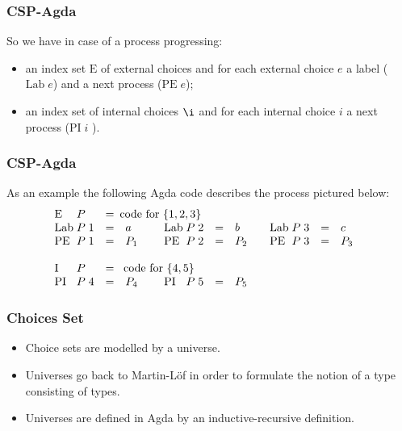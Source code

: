 \documentclass{beamer}
\newcommand{\pii}{\mathrm{PI}}
\newcommand{\pe}{\mathrm{PE}}
\newcommand{\ii}{\mathrm{I}}
\newcommand{\e}{\mathrm{E}}
\newcommand{\lab}{\mathrm{Lab}}
\newcommand{\includeXfigPictexWithoutFigure}[1]{\ifpdf
\begin{center}

\end{center}\else%
\begin{center}

\end{center}\fi}
\begin{document}
\begin{frame}
\frametitle{CSP-Agda}
So we have in case of a process progressing: 
\begin{itemize}

\item an index set $\e$ of external choices and for each external choice $e$ a label ($\lab\;e$) and a next process ($\pe\;e$);

\item an index set of internal choices $\i$ and for each internal choice $i$ a next process ($\pii\;i$ ).
\end{itemize}
\end{frame}







\begin{frame}
\frametitle{CSP-Agda}

As an example the following Agda code describes the process pictured below:
\[\begin{array}{@{}l@{}lclcl@{}lclcl@{}lcllclclclclclclclclcl}
\e \; &P &=& \multicolumn{25}{@{}l}{\mbox{code for }\{1,2,3\} 
\mbox{\qquad \qquad \qquad \qquad \qquad \qquad \qquad }}\\
\lab \; &P \;1 &=& a &\ & \lab \;&P\;2 &=& b & & \lab\; &P\;3 &=& c\\
\pe \; &P\;1 &=& P_1&  &\pe \; &P\;2 &=& P_2 & & \pe\; &P \;3 &=& P_3&
\\
\ \\
\ii\;&P&=& \multicolumn{25}{@{}l}{\mbox{ code for } \{4,5\}}\\
\pii \;&P\;4 &=& P_4&  &\pii \;&P\;5 &=& P_5
\end{array} \]

\includeXfigPictexWithoutFigure{exampleProcess}
\end{frame}



\begin{frame}
\frametitle{Choices Set}
\begin{itemize}

\item Choice sets are modelled by a universe. 

\item Universes go back to Martin-L{\"o}f in order to formulate the notion of a type consisting of types.

\item Universes are defined in Agda by an inductive-recursive definition.




\end{itemize}
\end{frame}
\end{document}
